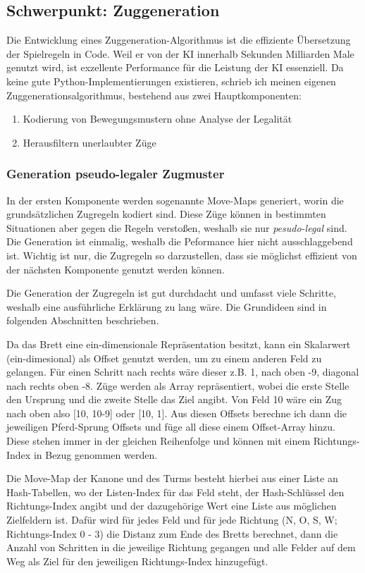 \documentclass{jpp}
\begin{document}
\subsection{Schwerpunkt: Zuggeneration}\label{subsec:zuggeneration}
Die Entwicklung eines Zuggeneration-Algorithmus ist die effiziente Übersetzung der Spielregeln in Code. Weil er von der KI innerhalb Sekunden Milliarden Male genutzt wird, ist exzellente 
Performance für die Leistung der KI essenziell. Da keine gute Python-Implementierungen existieren, schrieb ich meinen eigenen Zuggenerationsalgorithmus, bestehend aus zwei Hauptkomponenten:
\begin{enumerate}
    \item Kodierung von Bewegungsmustern ohne Analyse der Legalität
    \item Herausfiltern unerlaubter Züge
\end{enumerate}

\subsubsection{Generation pseudo-legaler Zugmuster}
In der ersten Komponente werden sogenannte Move-Maps generiert, worin die grundsätzlichen Zugregeln kodiert sind. Diese Züge können in bestimmten Situationen aber gegen die 
Regeln verstoßen, weshalb sie nur \textit{pesudo-legal} sind. Die Generation ist einmalig, weshalb die Peformance hier nicht ausschlaggebend ist. Wichtig ist nur, die Zugregeln so darzustellen, dass sie möglichst effizient von der nächsten Komponente genutzt werden können.

Die Generation der Zugregeln ist gut durchdacht und umfasst viele Schritte, weshalb eine ausführliche Erklärung zu lang wäre. Die Grundideen sind in folgenden Abschnitten beschrieben.

Da das Brett eine ein-dimensionale Repräsentation besitzt, kann ein Skalarwert (ein-dimesional) als Offset genutzt werden, um zu einem anderen Feld zu gelangen. Für einen Schritt nach rechts wäre dieser z.B. 1, nach oben -9, diagonal nach rechts oben -8. Züge werden als Array repräsentiert, wobei die erste Stelle den Ursprung und die zweite Stelle das Ziel angibt. Von Feld 10 wäre ein Zug nach oben also [10, 10-9] oder [10, 1]. Aus diesen Offsets berechne ich dann die jeweiligen Pferd-Sprung Offsets und füge all diese einem Offset-Array hinzu. Diese stehen immer in der gleichen Reihenfolge und können mit einem Richtungs-Index in Bezug genommen werden.

Die Move-Map der Kanone und des Turms besteht hierbei aus einer Liste an Hash-Tabellen, wo der Listen-Index für das Feld steht, der  Hash-Schlüssel den Richtungs-Index angibt und der dazugehörige Wert eine Liste aus möglichen Zielfeldern ist. Dafür wird für jedes Feld und für jede Richtung (N, O, S, W; Richtungs-Index 0 - 3) die Distanz zum Ende des Bretts berechnet, dann die Anzahl von Schritten in die jeweilige Richtung  gegangen und alle Felder auf dem Weg als Ziel für den jeweiligen Richtungs-Index hinzugefügt.
\end{document}
